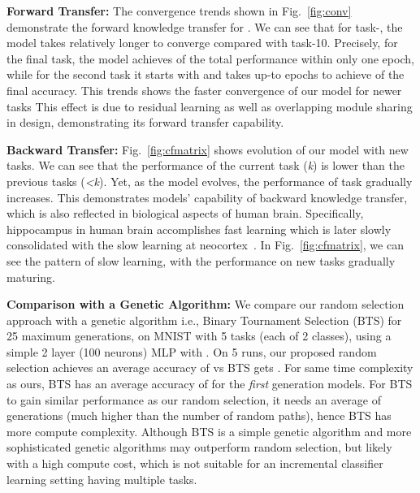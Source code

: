 \textbf{Forward Transfer:}
The convergence trends shown in Fig.~\ref{fig:conv} demonstrate the forward knowledge transfer for \ours{}. We can see that for task-, the model takes relatively longer to converge compared with task-10. Precisely, for the final task, the model achieves  of the total performance within only one epoch, while for the second task it starts with  and takes up-to  epochs to achieve  of the final accuracy. This trends shows the faster convergence of our model for newer tasks
This effect is due to residual learning as well as overlapping module sharing in \ours{} design, demonstrating its forward transfer capability.





\textbf{Backward Transfer:}
Fig.~\ref{fig:cfmatrix} shows evolution of our model with new tasks. We can see that the performance of the current task (\textit{k}) is lower than the previous tasks (\textit{<k}). Yet, as the model evolves, the performance of task  gradually increases. This demonstrates models' capability of backward knowledge transfer, which is also reflected in biological aspects of human brain. Specifically, hippocampus in human brain accomplishes fast learning which is later slowly consolidated with the slow learning at neocortex~\cite{DBLP:journals/corr/abs-1802-07569}. In Fig.~\ref{fig:cfmatrix}, we can see the pattern of slow learning, with the performance on new tasks gradually maturing.




\textbf{Comparison with a Genetic Algorithm:} We compare our random selection approach with a genetic algorithm i.e., Binary Tournament Selection (BTS) \cite{miller1995genetic} for 25 maximum generations, on MNIST with 5 tasks (each of 2 classes), using a simple 2 layer (100 neurons) MLP with . On 5 runs, our proposed random selection achieves an average accuracy of  vs BTS gets . For same time complexity as ours, BTS has an average accuracy of  for the \textit{first} generation models. For BTS to gain similar performance as our random selection, it needs an average of  generations (much higher than the number of random paths), hence BTS has more compute complexity. Although BTS is a simple genetic algorithm and more sophisticated genetic algorithms may outperform random selection, but likely with a high compute cost, which is not suitable for an incremental classifier learning setting having multiple tasks.


